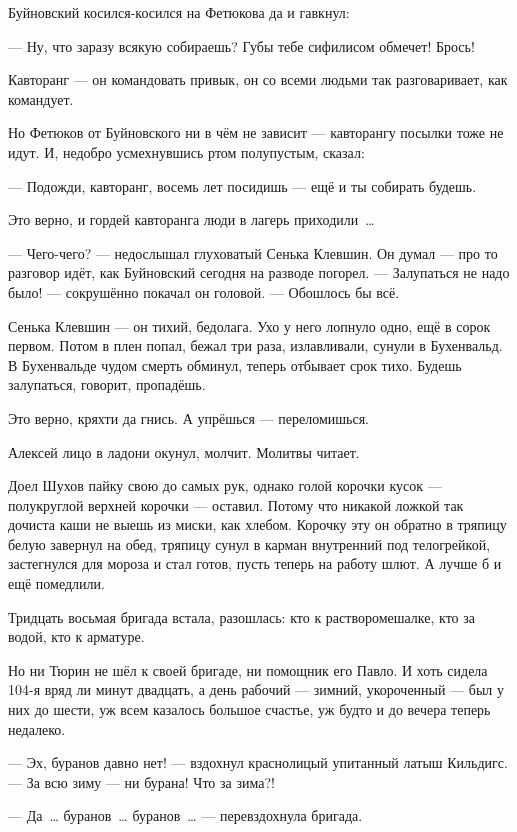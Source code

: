 Буйновский косился-косился на Фетюкова да и гавкнул:

--- Ну, что заразу всякую собираешь? Губы тебе сифилисом обмечет! Брось!

Кавторанг --- он командовать привык, он со всеми людьми так разговаривает, как командует.

Но Фетюков от Буйновского ни в чём не зависит --- кавторангу посылки тоже не идут. И, недобро 
усмехнувшись ртом полупустым, сказал:

--- Подожди, кавторанг, восемь лет посидишь --- ещё и ты собирать будешь.

Это верно, и гордей кавторанга люди в лагерь приходили~\dots{}

--- Чего-чего? --- недослышал глуховатый Сенька Клевшин. Он думал --- про то разговор идёт, как 
Буйновский сегодня на разводе погорел. --- Залупаться не надо было! --- сокрушённо покачал он 
головой. --- Обошлось бы всё.

Сенька Клевшин --- он тихий, бедолага. Ухо у него лопнуло одно, ещё в сорок первом. Потом в плен 
попал, бежал три раза, излавливали, сунули в Бухенвальд. В Бухенвальде чудом смерть обминул, 
теперь отбывает срок тихо. Будешь залупаться, говорит, пропадёшь.

Это верно, кряхти да гнись. А упрёшься --- переломишься.

Алексей лицо в ладони окунул, молчит. Молитвы читает.

Доел Шухов пайку свою до самых рук, однако голой корочки кусок --- полукруглой верхней 
корочки --- оставил. Потому что никакой ложкой так дочиста каши не выешь из миски, как хлебом. 
Корочку эту он обратно в тряпицу белую завернул на обед, тряпицу сунул в карман внутренний 
под телогрейкой, застегнулся для мороза и стал готов, пусть теперь на работу шлют. А лучше б и 
ещё помедлили.

Тридцать восьмая бригада встала, разошлась: кто к растворомешалке, кто за водой, кто к 
арматуре.

Но ни Тюрин не шёл к своей бригаде, ни помощник его Павло. И хоть сидела 104-я вряд ли минут 
двадцать, а день рабочий --- зимний, укороченный --- был у них до шести, уж всем казалось большое 
счастье, уж будто и до вечера теперь недалеко.

--- Эх, буранов давно нет! --- вздохнул краснолицый упитанный латыш Кильдигс. --- За всю зиму --- ни 
бурана! Что за зима?!

--- Да~\dots{} буранов~\dots{} буранов~\dots{} --- перевздохнула бригада.

